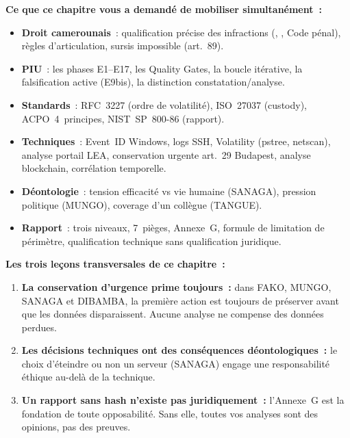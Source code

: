 \separateur

\begin{boxresume}
\textbf{Ce que ce chapitre vous a demandé de mobiliser simultanément~:}
\begin{itemize}
    \item \textbf{Droit camerounais}~: qualification précise des
          infractions (, ,
          Code pénal), règles d'articulation, sursis impossible
          (art.~89).

    \item \textbf{PIU}~: les phases E1--E17, les Quality Gates,
          la boucle itérative, la falsification active (E9bis),
          la distinction constatation/analyse.

    \item \textbf{Standards}~: RFC~3227 (ordre de volatilité),
          ISO~27037 (custody), ACPO~4~principes, NIST~SP~800-86
          (rapport).

    \item \textbf{Techniques}~: Event~ID Windows, logs SSH, Volatility
          (pstree, netscan), analyse portail LEA, conservation urgente
          art.~29 Budapest, analyse blockchain, corrélation temporelle.

    \item \textbf{Déontologie}~: tension efficacité vs vie humaine
          (SANAGA), pression politique (MUNGO), coverage d'un
          collègue (TANGUE).

    \item \textbf{Rapport}~: trois niveaux, 7~pièges, Annexe~G,
          formule de limitation de périmètre, qualification
          technique sans qualification juridique.
\end{itemize}

\textbf{Les trois leçons transversales de ce chapitre~:}
\begin{enumerate}
    \item \textbf{La conservation d'urgence prime toujours~:}
          dans FAKO, MUNGO, SANAGA et DIBAMBA, la première
          action est toujours de préserver avant que les données
          disparaissent. Aucune analyse ne compense des données
          perdues.
    \item \textbf{Les décisions techniques ont des conséquences
          déontologiques~:} le choix d'éteindre ou non un serveur
          (SANAGA) engage une responsabilité éthique au-delà de
          la technique.
    \item \textbf{Un rapport sans hash n'existe pas juridiquement~:}
          l'Annexe~G est la fondation de toute opposabilité.
          Sans elle, toutes vos analyses sont des opinions,
          pas des preuves.
\end{enumerate}
\end{boxresume}

